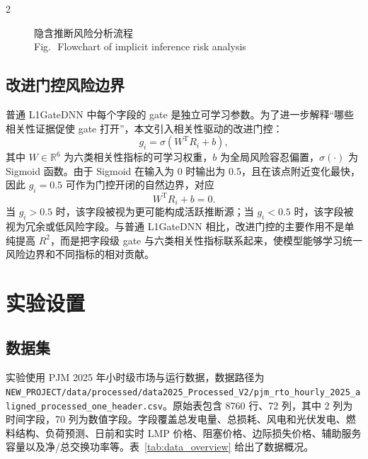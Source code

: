 \documentclass[UTF8,zihao=5,twoside]{ctexart}
\numberwithin{equation}{section}
\newcommand{\figbicaption}[2]{%
  \caption{#1\\[-0.2em]\small Fig.\,\thefigure\ #2}
}
\newcommand{\code}[1]{\texttt{#1}}
\begin{document}
\begin{multicols}{2}
\begin{figure}[H]
\centering
{}
\figbicaption{隐含推断风险分析流程}{Flowchart of implicit inference risk analysis}
\label{fig:method_flow}
\end{figure}

\subsection{改进门控风险边界}
普通 L1GateDNN 中每个字段的 gate 是独立可学习参数。为了进一步解释“哪些相关性证据促使 gate 打开”，本文引入相关性驱动的改进门控：
\begin{equation}
g_i=\sigma(W^{\mathrm{T}}R_i+b),
\end{equation}
其中 $W\in\mathbb{R}^{6}$ 为六类相关性指标的可学习权重，$b$ 为全局风险容忍偏置，$\sigma(\cdot)$ 为 Sigmoid 函数。由于 Sigmoid 在输入为 0 时输出为 0.5，且在该点附近变化最快，因此 $g_i=0.5$ 可作为门控开闭的自然边界，对应
\begin{equation}
W^{\mathrm{T}}R_i+b=0.
\end{equation}
当 $g_i>0.5$ 时，该字段被视为更可能构成活跃推断源；当 $g_i<0.5$ 时，该字段被视为冗余或低风险字段。与普通 L1GateDNN 相比，改进门控的主要作用不是单纯提高 $R^2$，而是把字段级 gate 与六类相关性指标联系起来，使模型能够学习统一风险边界和不同指标的相对贡献。

\section{实验设置}
\subsection{数据集}
实验使用 PJM 2025 年小时级市场与运行数据，数据路径为 \code{NEW\_PROJECT/data/processed/data2025\_Processed\_V2/pjm\_rto\_hourly\_2025\_aligned\_processed\_one\_header.csv}。原始表包含 8760 行、72 列，其中 2 列为时间字段，70 列为数值字段。字段覆盖总发电量、总损耗、风电和光伏发电、燃料结构、负荷预测、日前和实时 LMP 价格、阻塞价格、边际损失价格、辅助服务容量以及净/总交换功率等。表~\ref{tab:data_overview} 给出了数据概况。


\end{multicols}
\end{document}
